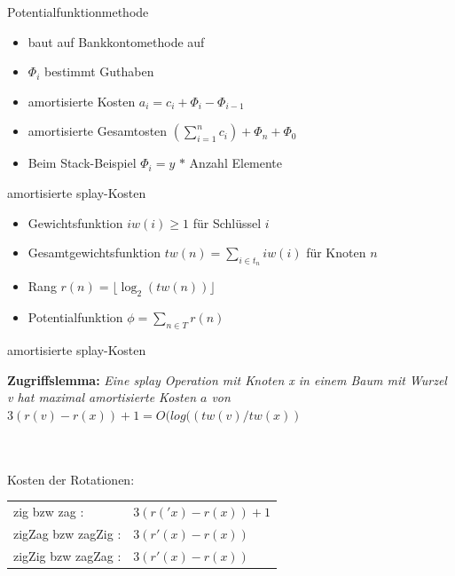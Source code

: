 \documentclass[11pt]{beamer}
\begin{document}
	\begin{frame} {Potentialfunktionmethode}
		  	\begin{itemize}
		  		\item baut auf Bankkontomethode auf
		  		\item  $\Phi_{i}$ bestimmt Guthaben
		  		\item amortisierte Kosten $a_i = c_i + \Phi_{i} - \Phi_{i-1} $
		  		\item amortisierte Gesamtosten $ (\sum \limits_{i=1}^n c_{i}) + \Phi_{n} + \Phi_{0}$
		  		\pause
		  		\item Beim Stack-Beispiel $\Phi_{i} = y$ $*$ Anzahl Elemente
		  	\end{itemize}
	\end{frame}	
	
		\begin{frame} {amortisierte splay-Kosten}
		  \begin{itemize}
		  	\item Gewichtsfunktion $iw(i) \geq 1$ für Schlüssel $i$
		  	\pause
		  	\item Gesamtgewichtsfunktion $tw(n) = \sum \limits_{i \in t_n} iw(i)$ für Knoten  $n$
			\pause		  
		  	\item Rang $r(n) =  \lfloor \log_2(tw(n)) \rfloor$
		  	\pause
		  	\item Potentialfunktion $\phi = \sum \limits_{n \in T } r(n)$
		  	
		  	
		  \end{itemize}	
	   \end{frame}	
	
		\begin{frame} {amortisierte splay-Kosten}
			  
	
			\begin{block}{\textbf{Zugriffslemma:}}
				\textit{Eine splay Operation mit Knoten x in einem Baum mit Wurzel v hat maximal  amortisierte Kosten $a$ von $3 (r (v) - r (x)) + 1 =  O( log(( tw(v)/tw(x))$ }
			\end{block}
			

			\pause
			\ \\
			\ \\
	   		Kosten der Rotationen:
	   		
	   		\begin{tabular}{ll}
	   		
	   		
	   		zig bzw zag : & $3 (r ('x) -r (x)) + 1$ \\
	   		
	  		zigZag bzw zagZig : &  $3 (r'(x) -r (x))$ \\
	  		
	   		zigZig bzw zagZag : & $3 (r' (x) -r (x))$ \\
	   	\end{tabular}
		\end{frame}	
	
\end{document}
